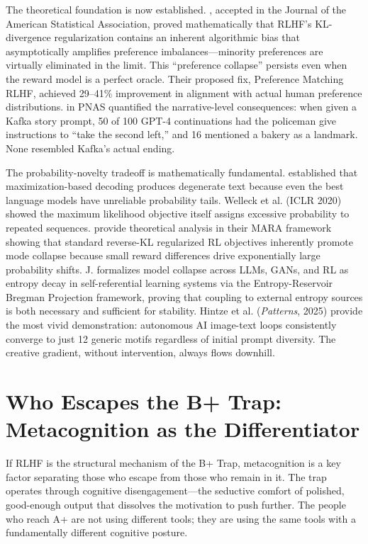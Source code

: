 \documentclass[12pt,a4paper]{article}
\begin{document}
The theoretical foundation is now established. \citet{xiao2025}, accepted in the Journal of the American Statistical Association, proved mathematically that RLHF's KL-divergence regularization contains an inherent algorithmic bias that asymptotically amplifies preference imbalances---minority preferences are virtually eliminated in the limit. This ``preference collapse'' persists even when the reward model is a perfect oracle. Their proposed fix, Preference Matching RLHF, achieved 29--41\% improvement in alignment with actual human preference distributions. \citet{xu2025} in PNAS quantified the narrative-level consequences: when given a Kafka story prompt, 50 of 100 GPT-4 continuations had the policeman give instructions to ``take the second left,'' and 16 mentioned a bakery as a landmark. None resembled Kafka's actual ending.

The probability-novelty tradeoff is mathematically fundamental. \citet{holtzman2020} established that maximization-based decoding produces degenerate text because even the best language models have unreliable probability tails. Welleck et al. (ICLR 2020) showed the maximum likelihood objective itself assigns excessive probability to repeated sequences. \citet{gxchen2025} provide theoretical analysis in their MARA framework showing that standard reverse-KL regularized RL objectives inherently promote mode collapse because small reward differences drive exponentially large probability shifts. J. \citet{chen2025entropy} formalizes model collapse across LLMs, GANs, and RL as entropy decay in self-referential learning systems via the Entropy-Reservoir Bregman Projection framework, proving that coupling to external entropy sources is both necessary and sufficient for stability. Hintze et al. (\emph{Patterns}, 2025) provide the most vivid demonstration: autonomous AI image-text loops consistently converge to just 12 generic motifs regardless of initial prompt diversity. The creative gradient, without intervention, always flows downhill.

\section{Who Escapes the B+ Trap: Metacognition as the Differentiator}
If RLHF is the structural mechanism of the B+ Trap, metacognition is a key factor separating those who escape from those who remain in it. The trap operates through cognitive disengagement---the seductive comfort of polished, good-enough output that dissolves the motivation to push further. The people who reach A+ are not using different tools; they are using the same tools with a fundamentally different cognitive posture.
\end{document}
